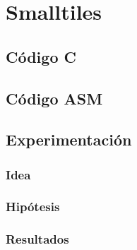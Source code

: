 \section{Smalltiles}

\subsection{Código C}
	
\subsection{Código ASM}
	
	
	
\subsection{Experimentación}
\subsubsection{Idea}	

\subsubsection{Hipótesis}
	
	
\subsubsection{Resultados}
	